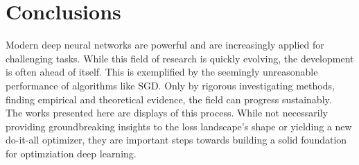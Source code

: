 \documentclass[a4paper]{scrartcl}
\begin{document}
\section*{Conclusions}
Modern deep neural networks are powerful and are increasingly applied for challenging tasks. While this field of research is quickly evolving, the development is often ahead of itself. This is exemplified by the seemingly unreasonable performance of algorithms like SGD. Only by rigorous investigating methods, finding empirical and theoretical evidence, the field can progress sustainably.\\
The works presented here are displays of this process. While not necessarily providing groundbreaking insights to the loss landscape's shape or yielding a new do-it-all optimizer, they are important steps towards building a solid foundation for optimziation deep learning.



\newpage



	
\end{document}
